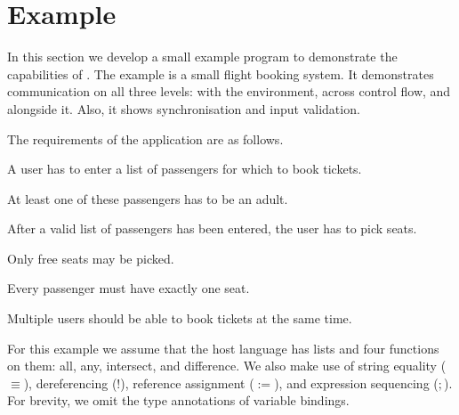 


\section{Example}
\label{sec:example}

In this section we develop a small example program to demonstrate the capabilities of \TOPHAT.
The example is a small flight booking system.
It demonstrates communication on all three levels: with the environment, across control flow, and alongside it.
Also, it shows synchronisation and input validation.

The requirements of the application are as follows.
\begin{enumerate*}
  \item A user has to enter a list of passengers for which to book tickets.
  \item At least one of these passengers has to be an adult.
  \item After a valid list of passengers has been entered, the user has to pick seats.
  \item Only free seats may be picked.
  \item Every passenger must have exactly one seat.
  \item Multiple users should be able to book tickets at the same time.
\end{enumerate*}
For this example we assume that the host language has lists and four functions on them: all, any, intersect, and difference.
We also make use of string equality ($\equiv$), dereferencing ($!$), reference assignment ($:=$), and expression sequencing ($;$).
For brevity, we omit the type annotations of variable bindings.



